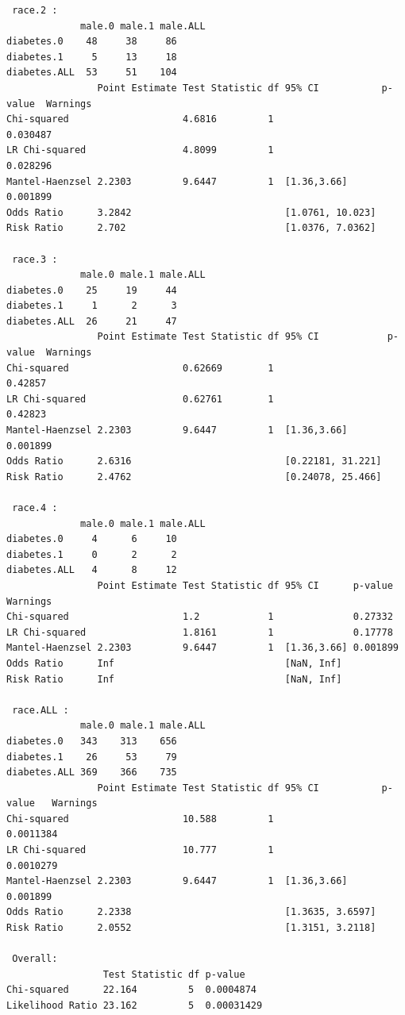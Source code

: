 \documentclass[11pt,letterpaper,fleqn]{report}
\begin{document}
\begin{enumerate}[]
{\begin{verbatim}
 race.2 : 
             male.0 male.1 male.ALL
diabetes.0    48     38     86     
diabetes.1     5     13     18     
diabetes.ALL  53     51    104     
                Point Estimate Test Statistic df 95% CI           p-value  Warnings
Chi-squared                    4.6816         1                   0.030487         
LR Chi-squared                 4.8099         1                   0.028296         
Mantel-Haenzsel 2.2303         9.6447         1  [1.36,3.66]      0.001899         
Odds Ratio      3.2842                           [1.0761, 10.023]                  
Risk Ratio      2.702                            [1.0376, 7.0362]                  

 race.3 : 
             male.0 male.1 male.ALL
diabetes.0    25     19     44     
diabetes.1     1      2      3     
diabetes.ALL  26     21     47     
                Point Estimate Test Statistic df 95% CI            p-value  Warnings
Chi-squared                    0.62669        1                    0.42857          
LR Chi-squared                 0.62761        1                    0.42823          
Mantel-Haenzsel 2.2303         9.6447         1  [1.36,3.66]       0.001899         
Odds Ratio      2.6316                           [0.22181, 31.221]                  
Risk Ratio      2.4762                           [0.24078, 25.466]                  

 race.4 : 
             male.0 male.1 male.ALL
diabetes.0     4      6     10     
diabetes.1     0      2      2     
diabetes.ALL   4      8     12     
                Point Estimate Test Statistic df 95% CI      p-value  Warnings
Chi-squared                    1.2            1              0.27332          
LR Chi-squared                 1.8161         1              0.17778          
Mantel-Haenzsel 2.2303         9.6447         1  [1.36,3.66] 0.001899         
Odds Ratio      Inf                              [NaN, Inf]                   
Risk Ratio      Inf                              [NaN, Inf]                   

 race.ALL : 
             male.0 male.1 male.ALL
diabetes.0   343    313    656     
diabetes.1    26     53     79     
diabetes.ALL 369    366    735     
                Point Estimate Test Statistic df 95% CI           p-value   Warnings
Chi-squared                    10.588         1                   0.0011384         
LR Chi-squared                 10.777         1                   0.0010279         
Mantel-Haenzsel 2.2303         9.6447         1  [1.36,3.66]      0.001899          
Odds Ratio      2.2338                           [1.3635, 3.6597]                   
Risk Ratio      2.0552                           [1.3151, 3.2118]                   

 Overall:  
                 Test Statistic df p-value   
Chi-squared      22.164         5  0.0004874 
Likelihood Ratio 23.162         5  0.00031429
\end{verbatim}}

\end{enumerate}
\end{document}
